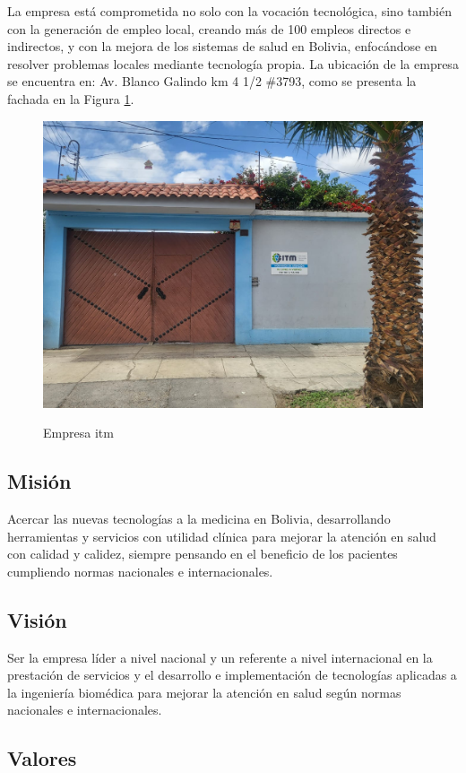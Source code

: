 La empresa está comprometida no solo con la vocación tecnológica, sino también con la generación de empleo local, creando más de 100 empleos directos e indirectos, y con la mejora de los sistemas de salud en Bolivia, enfocándose en resolver problemas locales mediante tecnología propia.
La ubicación de la empresa se encuentra en: Av. Blanco Galindo km 4 1/2 \#3793, como se presenta la fachada en la Figura \ref{fig:emp}.
\begin{figure}[!htb]
    \centering
    \caption{Empresa \acrshort{itm}} %
    {\includegraphics[width=0.6\columnwidth]{Figuras/itm.jpg}}\\
    \label{fig:emp}
\end{figure}


\subsection{Misión}
Acercar las nuevas tecnologías a la medicina en Bolivia, desarrollando herramientas y servicios con utilidad clínica para mejorar la atención en salud con calidad y calidez, siempre pensando en el beneficio de los pacientes cumpliendo normas nacionales e internacionales.

\subsection{Visión}
Ser la empresa líder a nivel nacional y un referente a nivel internacional en la prestación de servicios y el desarrollo e implementación de tecnologías aplicadas a la ingeniería biomédica para mejorar la atención en salud según normas nacionales e internacionales.

\subsection{Valores}

